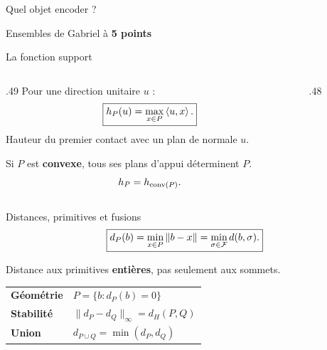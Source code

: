 \begin{frame}[t]{Quel objet encoder ?}
\begin{center}
{\small Ensembles de Gabriel à \textbf{5 points}}

\resizebox{\linewidth}{!}{}
\end{center}
\end{frame}

\begin{frame}{La fonction support }
\begin{columns}[c,onlytextwidth]
\begin{column}{.49\textwidth}
Pour une direction unitaire $u$ :
\[
\boxed{h_P(u)=\max_{x\in P}\left\langle u,x\right\rangle.}
\]
Hauteur du premier contact avec un plan de normale $u$.\par\medskip
Si $P$ est \textbf{convexe}, tous ses plans d'appui déterminent $P$.
\[h_P=h_{\mathrm{conv}(P)}.\]
\end{column}
\begin{column}{.48\textwidth}\centering
\resizebox{\linewidth}{!}{}
\end{column}
\end{columns}
\end{frame}

\begin{frame}[t]{Distances, primitives et fusions}
\[
\boxed{d_P(b)=\min_{x\in P}\left\lVert b-x\right\rVert=\min_{\sigma\in\mathcal F}d(b,\sigma).}
\]
{\small Distance aux primitives \textbf{entières}, pas seulement aux sommets.\par}
\vspace{.14cm}
\begin{tabular}{@{}p{}p{}@{}}
\textbf{Géométrie} & $P=\{b:d_P(b)=0\}$\\[.25cm]
\textbf{Stabilité} & $\|d_P-d_Q\|_\infty=d_H(P,Q)$\\[.25cm]
\textbf{Union} & $d_{P\cup Q}=\min(d_P,d_Q)$
\end{tabular}\par

\end{frame}

